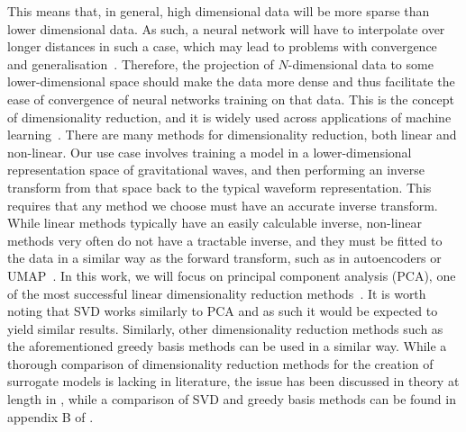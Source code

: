 \documentclass[%
 reprint,
superscriptaddress,
nofootinbib,
 amsmath,amssymb,
 aps,
prd,
floatfix,
]{revtex4-2}
\newcommand{\change}[1]{#1}
\begin{document}
%
 This means that, in general, high dimensional data will be more sparse than lower dimensional data. As such, a neural network will have to interpolate over longer distances in such a case, which may lead to problems with convergence and generalisation~\cite{curse_of_dim}. Therefore, the projection of $N$-dimensional data to some lower-dimensional space should make the data more dense and thus facilitate the ease of convergence of neural networks training on that data. This is the concept of dimensionality reduction, and it is widely used across applications of machine learning~\cite{DimRed_grapes,DimRed_phys,DimRed_wav}. 
There are many methods for dimensionality reduction, both linear and non-linear. Our use case involves training a model in a lower-dimensional representation space of gravitational waves, and then performing an inverse transform from that space back to the typical waveform representation. This requires that any method we choose must have an accurate inverse transform. While linear methods typically have an easily calculable inverse, non-linear methods very often do not have a tractable inverse, and they must be fitted to the data in a similar way as the forward transform, such as in autoencoders or UMAP~\cite{ae_ref,umap}. In this work, we will focus on principal component analysis (PCA), one of the most successful linear dimensionality reduction methods~\cite{PCA_ref,pca_rev}. It is worth noting that SVD works similarly to PCA and as such it would be expected to yield similar results. Similarly, other dimensionality reduction methods such as the aforementioned greedy basis methods can be used in a similar way. \change{While a thorough comparison of dimensionality reduction methods for the creation of surrogate models is lacking in literature, the issue has been discussed in theory at length in \cite{ROMs_Surs_review}, while a comparison of SVD and greedy basis methods can be found in appendix B of \cite{svd_vs_greedy}. }
\end{document}
